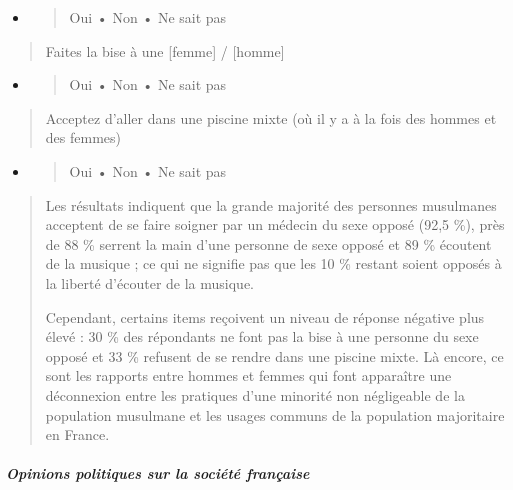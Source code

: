 \begin{itemize}
\item
  \begin{quote}
  Oui • Non • Ne sait pas
  \end{quote}
\end{itemize}

\begin{quote}
Faites la bise à une {[}femme{]} / {[}homme{]}
\end{quote}

\begin{itemize}
\item
  \begin{quote}
  Oui • Non • Ne sait pas
  \end{quote}
\end{itemize}

\begin{quote}
Acceptez d'aller dans une piscine mixte (où il y a à la fois des hommes
et des femmes)
\end{quote}

\begin{itemize}
\item
  \begin{quote}
  Oui • Non • Ne sait pas
  \end{quote}
\end{itemize}

\begin{quote}


Les résultats indiquent que la grande majorité des personnes musulmanes
acceptent de se faire soigner par un médecin du sexe opposé (92,5 \%),
près de 88 \% serrent la main d'une personne de sexe opposé et 89 \%
écoutent de la musique ; ce qui ne signifie pas que les 10 \% restant
soient opposés à la liberté d'écouter de la musique.

Cependant, certains items reçoivent un niveau de réponse négative plus
élevé : 30 \% des répondants ne font pas la bise à une personne du sexe
opposé et 33 \% refusent de se rendre dans une piscine mixte. Là encore,
ce sont les rapports entre hommes et femmes qui font apparaître une
déconnexion entre les pratiques d'une minorité non négligeable de la
population musulmane et les usages communs de la population majoritaire
en France.
\end{quote}

\hypertarget{opinions-politiques-sur-la-sociuxe9tuxe9-franuxe7aise}{%
\subparagraph{Opinions politiques sur la société
française}\label{opinions-politiques-sur-la-sociuxe9tuxe9-franuxe7aise}}

